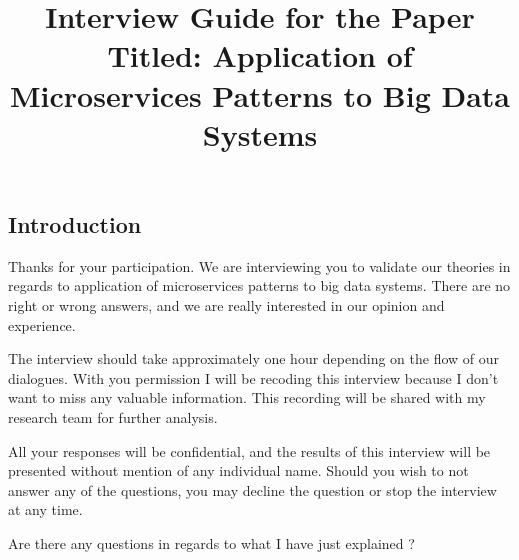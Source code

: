 \documentclass[conference]{IEEEtran}
\begin{document}
\title{Interview Guide for the Paper Titled: Application of Microservices Patterns to Big Data Systems\\
}


\maketitle

\subsection{Introduction}

Thanks for your participation. We are interviewing you to validate our theories in regards to application of microservices patterns to big data systems. There are no right or wrong answers, and we are really interested in our opinion and experience. 

The interview should take approximately one hour depending on the flow of our dialogues. With you permission I will be recoding this interview because I don't want to miss any valuable information. This recording will be shared with my research team for further analysis. 

All your responses will be confidential, and the results of this interview will be presented without mention of any individual name. Should you wish to not answer any of the questions, you may decline the question or stop the interview at any time. 

Are there any questions in regards to what I have just explained ?

\hspace{2cm}
\end{document}
